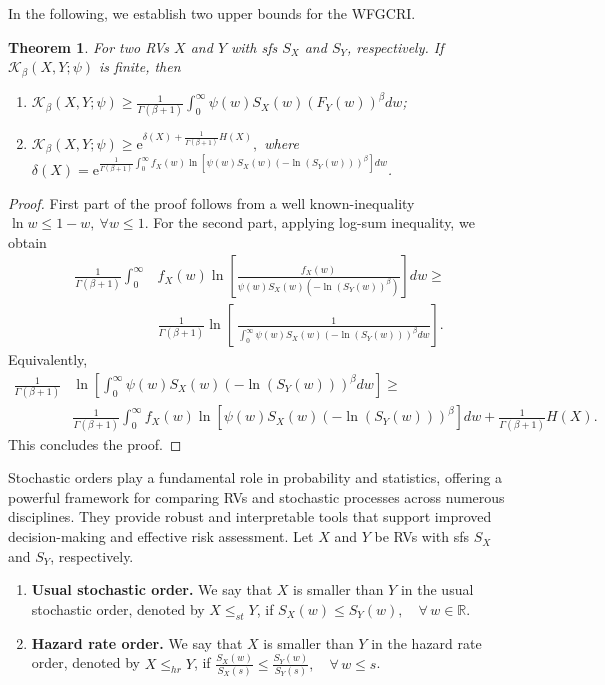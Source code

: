\documentclass[12pt,a4paper]{article}
\numberwithin{equation}{section}
\newtheorem{theorem}{Theorem}[section]
\begin{document}
In the following, we establish two upper bounds for the WFGCRI.
	\begin{theorem}
		For two RVs $X$ and $Y$ with sfs $S_X$ and $S_Y$, respectively. If $\mathcal K_\beta(X,Y;\psi)$ is finite, then
		\begin{enumerate}
			\item[(i)] $
			\mathcal K_\beta(X, Y;\psi) \geq \frac{1}{\Gamma(\beta+1)}\int_0^{\infty} \psi(w) S_X(w)(F_Y(w))^\beta dw
			$;
			\item[(ii)] $\mathcal K_\beta(X,Y;\psi)\geq \mathrm{e}^{\delta(X)+\frac{1}{\Gamma(\beta+1)} H(X)},$ where $\delta(X)=\mathrm{e}^{\frac{1}{\Gamma(\beta+1)}\int_0^{\infty} f_X(w)\ln\left[\psi(w)S_X(w)(-\ln(S_Y(w)))^\beta\right]dw}$.
		\end{enumerate}
	\end{theorem}
	\begin{proof}
		First part of the proof follows from a well known-inequality $\ln w\leq 1-w,~ \forall w\leq 1$. For the second part, applying log-sum inequality, we obtain
		\begin{align*}
		\frac{1}{\Gamma(\beta+1)}	\int_0^{\infty}& f_X(w)\ln\left[\frac{f_X(w)}{\psi(w)S_X(w)\left(-\ln(S_Y(w))^\beta\right)}\right]dw\geq \\	&\frac{1}{\Gamma(\beta+1)}\ln\left[\
			\frac{1}{\int_0^{\infty} \psi(w)S_X(w)\left(-\ln(S_Y(w))\right)^\beta dw}\right].
		\end{align*}
		Equivalently, 
		\begin{align*}
	\frac{1}{\Gamma(\beta+1)}&	\ln\left[\int_0^{\infty} \psi(w)S_X(w)\left(-\ln(S_Y(w))\right)^\beta dw\right]	\geq\\&\frac{1}{\Gamma(\beta+1)} {\int_0^{\infty} f_X(w)\ln\left[\psi(w)S_X(w)(-\ln(S_Y(w)))^\beta\right]dw}+\frac{1}{\Gamma(\beta+1)}{H(X)}.
		\end{align*}
		This  concludes the proof.
	\end{proof}
    Stochastic orders play a fundamental role in probability and statistics, offering a powerful framework for comparing RVs and stochastic processes across numerous disciplines. They provide robust and interpretable tools that support improved decision-making and effective risk assessment. Let $X$ and $Y$ be RVs with sfs $S_X$ and $S_Y$, respectively. 
\begin{enumerate}
	\item \textbf{Usual stochastic order.}  
	We say that $X$ is smaller than $Y$ in the usual stochastic order, denoted by $X \leq_{st} Y$, if
	$
	S_X(w) \leq S_Y(w), \quad \forall\, w \in \mathbb{R}.
	$
	
	\item \textbf{Hazard rate order.}  
	We say that $X$ is smaller than $Y$ in the hazard rate order, denoted by $X \leq_{hr} Y$, if
	$
	\frac{S_X(w)}{S_X(s)} \leq \frac{S_Y(w)}{S_Y(s)}, 
	\quad \forall\, w \leq s
	$.
\end{enumerate}
\end{document}
